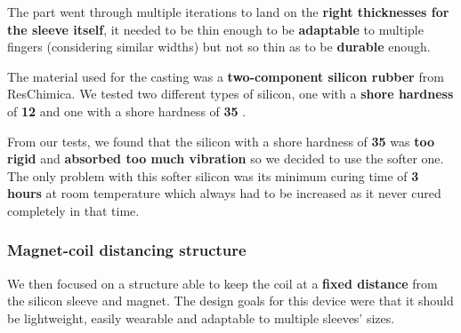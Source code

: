 The part went through multiple iterations to land on the \textbf{right thicknesses for the sleeve itself}, it needed to be thin enough to be \textbf{adaptable} to multiple fingers (considering similar widths) but not so thin as to be \textbf{durable} enough.

The material used for the casting was a \textbf{two-component silicon rubber} from ResChimica.
We tested two different types of silicon, one with a \textbf{shore hardness} of \textbf{12} \cite{R_Pro_10_silicon} and one with a shore hardness of \textbf{35} \cite{R_Pro_Fast_silicon}.

From our tests, we found that the silicon with a shore hardness of \textbf{35} was \textbf{too rigid} and \textbf{absorbed too much vibration} so we decided to use the softer one.
The only problem with this softer silicon was its minimum curing time of \textbf{3 hours} at room temperature which always had to be increased as it never cured completely in that time.

\subsubsection{Magnet-coil distancing structure}
We then focused on a structure able to keep the coil at a \textbf{fixed distance} from the silicon sleeve and magnet.
The design goals for this device were that it should be lightweight, easily wearable and adaptable to multiple sleeves' sizes.



